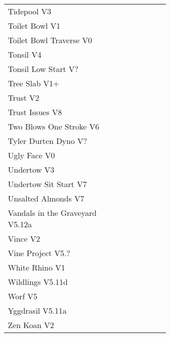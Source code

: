 \begin{flushleft}
\begin{center}
\begin{supertabular}{p{0.65\linewidth}r}
Tidepool V3 & \pageref{rt:Tidepool} \\
Toilet Bowl V1 & \pageref{rt:Toilet Bowl} \\
Toilet Bowl Traverse V0 & \pageref{rt:Toilet Bowl Traverse} \\
Tonsil V4 & \pageref{rt:Tonsil} \\
Tonsil Low Start V? & \pageref{vr:Tonsil Low Start} \\
Tree Slab V1+ & \pageref{rt:Tree Slab} \\
Trust V2 & \pageref{rt:Trust} \\
Trust Issues V8 & \pageref{rt:Trust Issues} \\
Two Blows One Stroke V6 & \pageref{rt:Two Blows One Stroke} \\
Tyler Durten Dyno V? & \pageref{vr:Tyler Durten Dyno} \\
Ugly Face V0 & \pageref{rt:Ugly Face} \\
Undertow V3 & \pageref{rt:Undertow} \\
Undertow Sit Start V7 & \pageref{vr:Undertow Sit Start} \\
Unsalted Almonds V7 & \pageref{rt:Unsalted Almonds} \\
Vandals in the Graveyard V5.12a & \pageref{rt:Vandals in the Graveyard} \\
Vince V2 & \pageref{rt:Vince} \\
Vine Project V5.? & \pageref{rt:Vine Project} \\
White Rhino V1 & \pageref{rt:White Rhino} \\
Wildlings V5.11d & \pageref{rt:Wildlings} \\
Worf V5 & \pageref{rt:Worf} \\
Yggdrasil V5.11a & \pageref{rt:Yggdrasil} \\
Zen Koan V2 & \pageref{rt:Zen Koan} \\
\end{supertabular}
\end{center}

\end{flushleft}
